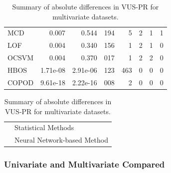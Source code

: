 \documentclass[12pt,oneside]{article}
\begin{document}
\begin{table}[htbp]
\begin{tabular}{lrrrrrrr}
        \rowcolor{lightgray} MCD & 0.007 & 0.544 & 194 & 5 & 2 & 1 & 1 \\
        \rowcolor{lightgray} LOF & 0.004 & 0.340 & 156 & 1 & 2 & 1 & 0 \\
        \rowcolor{lightgray} OCSVM & 0.004 & 0.370 & 017 & 1 & 2 & 2 & 0 \\
        \rowcolor{lightgray} HBOS & 1.71e-08 & 2.91e-06 & 123 & 463 & 0 & 0 & 0 \\
        \rowcolor{lightgray} COPOD & 9.61e-18 & 2.22e-16 & 008 & 2 & 0 & 0 & 0 \\
        \bottomrule
    \end{tabular}
    \par
    \vspace{1em}
    \noindent 
    \begin{tabular}{@{} p{1em} l @{}} 
        \rowcolor{lightgray} \strut & Statistical Methods \\
        \rowcolor{myLightBlue} \strut & Neural Network-based Method \\
    \end{tabular}
    \caption{\label{tab:Table 3} Summary of absolute differences in VUS-PR for multivariate datasets.}
\end{table}

\subsubsection{Univariate and Multivariate Compared}
\end{document}
